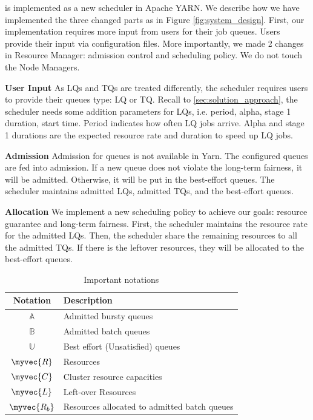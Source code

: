\name is implemented as a new scheduler in Apache YARN. We describe how we have implemented the three changed parts as in Figure \ref{fig:system_design}. First, our implementation requires more input from users for their job queues. Users provide their input via configuration files. More importantly, we made 2 changes in Resource Manager: admission control and \name scheduling policy. We do not touch the Node Managers.

\textbf{User Input } As LQs and TQs are treated differently, the \name scheduler requires users to provide their queues type: LQ or TQ. Recall to \ref{sec:solution_approach}, the scheduler needs some addition parameters for LQs, i.e. period, alpha, stage 1 duration, start time. Period indicates how often LQ jobs arrive. Alpha and stage 1 durations are the expected resource rate and duration to speed up LQ jobs.

\textbf{Admission } Admission for queues is not available in Yarn. The configured queues are fed into admission. If a new queue does not violate the long-term fairness, it will be admitted. Otherwise, it will be put in the best-effort queues. The \name scheduler maintains admitted LQs, admitted TQs, and the best-effort queues. 

\textbf{Allocation } We implement a new scheduling policy to achieve our goals: resource guarantee and long-term fairness. First, the scheduler maintains the resource rate for the admitted LQs. Then, the scheduler share the remaining resources to all the admitted TQs. If there is the leftover resources, they will be allocated to the best-effort queues.

\begin{table}
\centering
\caption{Important notations} 
\begin{tabular}{|c|l|} \hline
Notation & Description \\ \hline \hline
$\mathbb{A}$ & Admitted bursty queues \\ \hline
$\mathbb{B}$ & Admitted batch queues \\ \hline
$\mathbb{U}$ & Best effort (Unsatisfied) queues \\ \hline
$\myvec{R}$ & Resources \\ \hline
$\myvec{C}$ & Cluster resource capacities \\ \hline
$\myvec{L}$ & Left-over Resources \\ \hline
$\myvec{R_b}$ & Resources allocated to admitted batch queues \\ \hline
\hline\end{tabular}
\label{tbl:notations}
\end{table}

